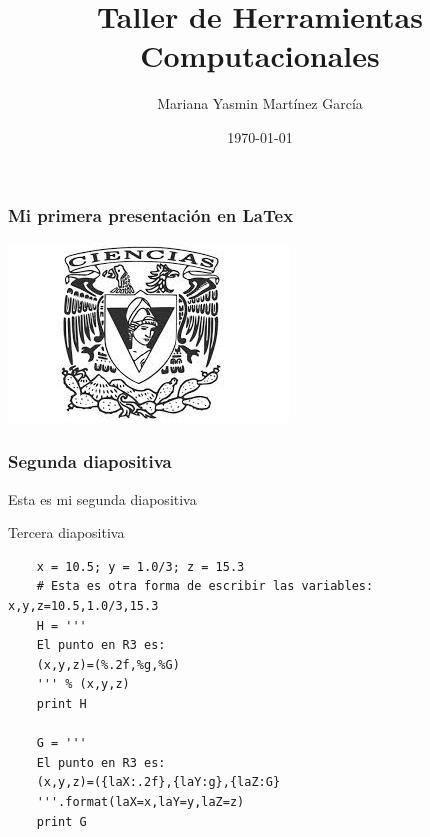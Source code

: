 \documentclass{beamer}
\title{Taller de Herramientas Computacionales}
\author{Mariana Yasmin Martínez García}
\date{\today}
\begin{document}
	
\begin{frame}
	\frametitle{Mi primera presentación en LaTex}
	\includegraphics[scale=0.50]{1}
\end{frame}

\begin{frame}
	\frametitle{Segunda diapositiva}
	Esta es mi segunda diapositiva
\end{frame}

\begin{frame}[fragile] {Tercera diapositiva} %
	\begin{verbatim}
	x = 10.5; y = 1.0/3; z = 15.3
	# Esta es otra forma de escribir las variables: x,y,z=10.5,1.0/3,15.3
	H = '''
	El punto en R3 es:
	(x,y,z)=(%.2f,%g,%G)
	''' % (x,y,z)
	print H
	
	G = '''
	El punto en R3 es:
	(x,y,z)=({laX:.2f},{laY:g},{laZ:G}
	'''.format(laX=x,laY=y,laZ=z)
	print G
	\end{verbatim}
\end{frame}
\end{document}
